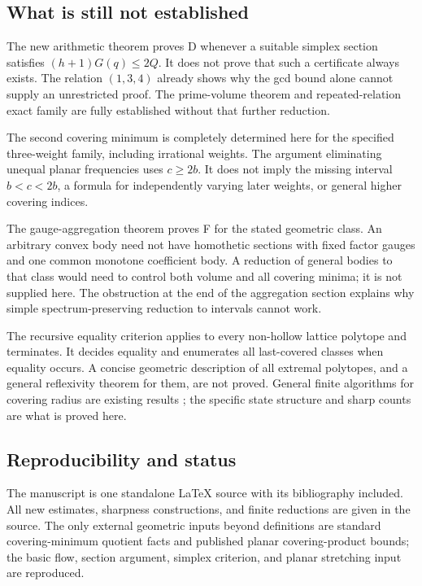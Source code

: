 \documentclass[11pt,a4paper]{article}
\theoremstyle{remark}\newtheorem{remark}[theorem]{Remark}
\begin{document}
\subsection{What is still not established}

The new arithmetic theorem proves D whenever a suitable simplex
section satisfies $(h+1)G(q)\le2Q$. It does not prove that such a
certificate always exists. The relation $(1,3,4)$ already shows
why the gcd bound alone cannot supply an unrestricted proof.
The prime-volume theorem and repeated-relation exact family are
fully established without that further reduction.

The second covering minimum is completely determined here for the
specified three-weight family, including irrational weights.
The argument eliminating unequal planar frequencies uses $c\ge2b$.
It does not imply the missing interval $b<c<2b$, a formula for
independently varying later weights, or general higher covering
indices.

The gauge-aggregation theorem proves F for the stated geometric
class. An arbitrary convex body need not have homothetic sections
with fixed factor gauges and one common monotone coefficient body.
A reduction of general bodies to that class would need to control
both volume and all covering minima; it is not supplied here.
The obstruction at the end of the aggregation section explains why
simple spectrum-preserving reduction to intervals cannot work.

The recursive equality criterion applies to every non-hollow
lattice polytope and terminates. It decides equality and enumerates
all last-covered classes when equality occurs. A concise geometric
description of all extremal polytopes, and a general reflexivity
theorem for them, are not proved. General finite algorithms for
covering radius are existing results \cite{ComputingRadius}; the
specific state structure and sharp counts are what is proved here.

\subsection{Reproducibility and status}

The manuscript is one standalone \LaTeX{} source with its bibliography
included. All new estimates, sharpness constructions, and finite
reductions are given in the source. The only external geometric
inputs beyond definitions are standard covering-minimum quotient
facts and published planar covering-product bounds; the basic
flow, section argument, simplex criterion, and planar stretching
input are reproduced.
\end{document}
